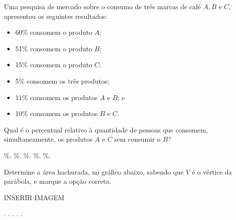 \begin{question}%
Uma pesquisa de mercado sobre o consumo de três marcas de café \(A,B\) e \(C\), apresentou os seguintes resultados:

\begin{itemize}
    \item 60\% consomem o produto \(A\);
    \item 51\% consomem o produto \(B\);
    \item 15\% consomem o produto \(C\);
    \item 5\% consomem os três produtos;
    \item 11\% consomem os produtos \(A\) e \(B\); e
    \item 10\% consomem os produtos \(B\) e \(C\).
\end{itemize}
Qual é o percentual relativo à quantidade de pessoas que consomem, simultaneamente, os produtos \(A\) e \(C\) sem consumir o \(B\)?
    \begin{tasks}
        \%.
        \%.
        \%.
        \%.
        \%.
    \end{tasks}
\end{question}

\begin{question}%
Determine a área hachurada, no gráfico abaixo, sabendo que \(V\) é o vértice da parábola, e marque a opção correta.

INSERIR IMAGEM
    \begin{tasks}
        .
        .
        .
        .
        .
    \end{tasks}
\end{question}
